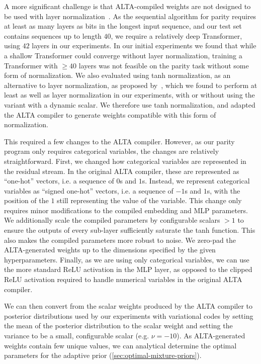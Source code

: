 A more significant challenge is that ALTA-compiled weights are not designed to be used with layer normalization~\citep{ba2016layer}. As the sequential algorithm for parity requires at least as many layers as bits in the longest input sequence, and our test set contains sequences up to length $40$, we require a relatively deep Transformer, using $42$ layers in our experiments. In our initial experiments we found that while a shallow Transformer could converge without layer normalization, training a Transformer with $\geq 40$ layers was not feasible on the parity task without some form of normalization. We also evaluated using tanh normalization, as an alternative to layer normalization, as proposed by~\citet{zhu2025transformers}, which we found to perform at least as well as layer normalization in our experiments, with or without using the variant with a dynamic scalar. We therefore use tanh normalization, and adapted the ALTA compiler to generate weights compatible with this form of normalization.

This required a few changes to the ALTA compiler. However, as our parity program only requires categorical variables, the changes are relatively straightforward. First, we changed how categorical variables are represented in the residual stream. In the original ALTA compiler, these are represented as ``one-hot'' vectors, i.e. a sequence of $0$s and $1$s. Instead, we represent categorical variables as ``signed one-hot'' vectors, i.e. a sequence of $-1$s and $1$s, with the position of the $1$ still representing the value of the variable. This change only requires minor modifications to the compiled embedding and MLP parameters. We additionally scale the compiled parameters by configurable scalars $>1$ to ensure the outputs of every sub-layer sufficiently saturate the tanh function. This also makes the compiled parameters more robust to noise. We zero-pad the ALTA-generated weights up to the dimensions specified by the given hyperparameters. Finally, as we are using only categorical variables, we can use the more standard ReLU activation in the MLP layer, as opposed to the clipped ReLU activation required to handle numerical variables in the original ALTA compiler.

We can then convert from the scalar weights produced by the ALTA compiler to posterior distributions used by our experiments with variational codes by setting the mean of the posterior distribution to the scalar weight and setting the variance to be a small, configurable scalar (e.g. $\nu = -10$). As ALTA-generated weights contain few unique values, we can analytical determine the optimal parameters for the adaptive prior (\ref{sec:optimal-mixture-priors}).


